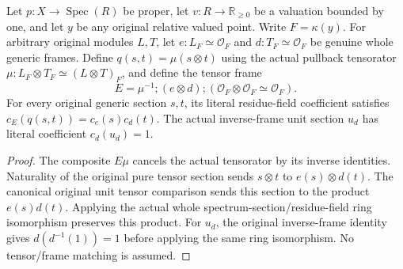 \begin{lemma}
\label{lem:seven-general-generic-tensor-coefficient}
\leanok
Let $p:X\to\operatorname{Spec}(R)$ be proper, let
$v:R\to\mathbb R_{\geq 0}$ be a valuation bounded by one, and let $y$ be any original
relative valued point. Write $F=\kappa(y)$. For arbitrary original modules
$L,T$, let $e:L_F\simeq\mathcal O_F$ and $d:T_F\simeq\mathcal O_F$
be genuine whole generic frames. Define $q(s,t)=\mu(s\otimes t)$ using
the actual pullback tensorator
$\mu:L_F\otimes T_F\simeq(L\otimes T)_F$, and define the tensor frame
\[
 E=\mu^{-1};(e\otimes d);
   (\mathcal O_F\otimes\mathcal O_F\simeq\mathcal O_F).
\]
For every original generic section $s,t$, its literal residue-field
coefficient satisfies $c_E(q(s,t))=c_e(s)c_d(t)$. The actual inverse-frame
unit section $u_d$ has literal coefficient $c_d(u_d)=1$.
\end{lemma}
\begin{proof}
The composite $E\mu$ cancels the actual tensorator by its inverse identities.
Naturality of the original pure tensor section sends $s\otimes t$ to
$e(s)\otimes d(t)$. The canonical original unit tensor comparison sends
this section to the product $e(s)d(t)$. Applying the actual whole
spectrum-section/residue-field ring isomorphism preserves this product.
For $u_d$, the original inverse-frame identity gives $d(d^{-1}(1))=1$
before applying the same ring isomorphism. No tensor/frame matching is assumed.
\end{proof}

